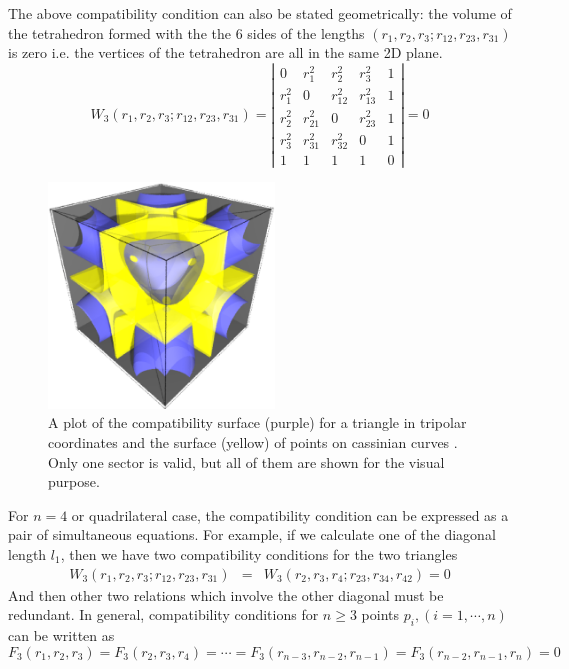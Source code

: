 \documentclass{article}
\begin{document}
The above compatibility condition can also be stated geometrically: the volume of the tetrahedron formed with the the 6 sides of the lengths $(r_1,r_2,r_3;r_{12},r_{23},r_{31})$ is zero i.e. the vertices of the tetrahedron are all in the same 2D plane. 
\begin{equation}
\label{}
W_3(r_1,r_2,r_3;r_{12},r_{23},r_{31}) =\left|\begin{array}{ccccc}
0 &  r_{1}^2 & r_{2}^2 & r_{3}^2 & 1 \\
r_{1}^2 &  0 & r_{12}^2 & r_{13}^2 & 1 \\
r_{2}^2 &  r_{21}^2 & 0 & r_{23}^2 & 1 \\
r_{3}^2 &  r_{31}^2 & r_{32}^2 & 0 & 1 \\
 1 & 1 & 1 & 1 & 0  
\end{array}\right|=0
\end{equation} 
\begin{figure}[H]
\begin{center}
\includegraphics[width=6cm]{images/compatibility_tripolar.eps}
\caption{A plot of the compatibility surface (purple) for a triangle in tripolar coordinates and the surface (yellow) of points on cassinian curves . Only one sector is valid, but all of them are shown for the visual purpose.}
\label{fig:compat_tripol}
\end{center}
\end{figure}
For $n=4$ or quadrilateral case, the compatibility condition can be expressed as a pair of simultaneous equations.
 For example, if we calculate one of the diagonal length $l_1$, then we have two compatibility conditions for the two triangles
\begin{eqnarray}
W_3(r_1,r_2,r_3;r_{12},r_{23},r_{31})  & = & W_3(r_2,r_3,r_4;r_{23},r_{34},r_{42})   =  0   
\end{eqnarray}
And then other two relations which involve the other diagonal must be redundant.
In general, compatibility conditions for $n \ge 3$ points $p_i, (i=1,\cdots,n)$ can be written as
\begin{equation}
\label{}
F_3(r_1,r_2,r_3) =  F_3(r_2,r_3,r_4) = \cdots = F_3(r_{n-3},r_{n-2},r_{n-1})= F_3(r_{n-2},r_{n-1},r_{n})=0
\end{equation}
\end{document}
